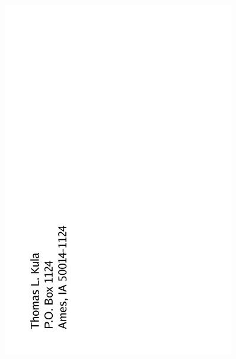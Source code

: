 \documentclass[12pt]{article}
\begin{document}
      
\newpage

\includegraphics[width=101mm]{backpage.png}
\end{document}
